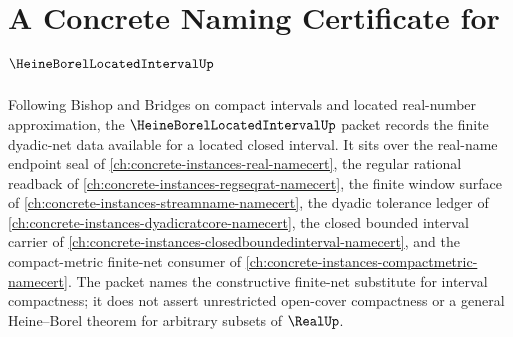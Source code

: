 \chapter{A Concrete Naming Certificate for $\HeineBorelLocatedIntervalUp$}
\label{ch:concrete-instances-heine-borel-located-interval-namecert}

Following Bishop and Bridges on compact intervals and located real-number approximation, the $\HeineBorelLocatedIntervalUp$ packet records the finite dyadic-net data available for a located closed interval. It sits over the real-name endpoint seal of \autoref{ch:concrete-instances-real-namecert}, the regular rational readback of \autoref{ch:concrete-instances-regseqrat-namecert}, the finite window surface of \autoref{ch:concrete-instances-streamname-namecert}, the dyadic tolerance ledger of \autoref{ch:concrete-instances-dyadicratcore-namecert}, the closed bounded interval carrier of \autoref{ch:concrete-instances-closedboundedinterval-namecert}, and the compact-metric finite-net consumer of \autoref{ch:concrete-instances-compactmetric-namecert}. The packet names the constructive finite-net substitute for interval compactness; it does not assert unrestricted open-cover compactness or a general Heine--Borel theorem for arbitrary subsets of $\RealUp$.

